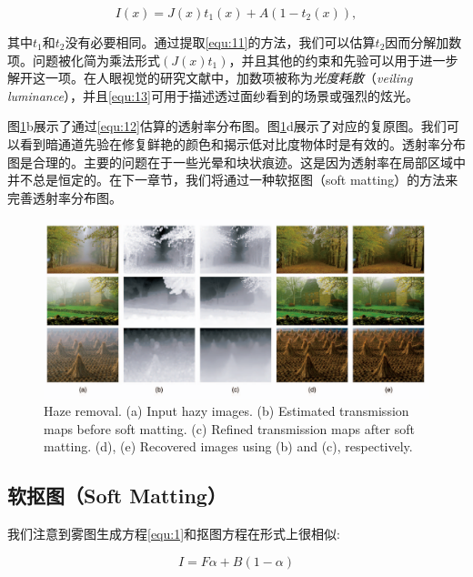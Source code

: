 \documentclass{ctexart}
\begin{document}
\begin{equation}\label{equ:13}
	I(x) = J(x)t_1(x) + A(1 - t_2(x)),
\end{equation}

其中$t_1$和$t_2$没有必要相同。通过提取\ref{equ:11}的方法，我们可以估算$t_2$因而分解加数项。问题被化简为乘法形式$(J(x)t_1)$，并且其他的约束和先验可以用于进一步解开这一项。在人眼视觉的研究文献\cite{GilchristJacobsen1983}中，加数项被称为\emph{光度耗散}（\emph{veiling luminance}），并且\ref{equ:13}可用于描述透过面纱看到的场景或强烈的炫光。\par

图\ref{fig:06}b展示了通过\ref{equ:12}估算的透射率分布图。图\ref{fig:06}d展示了对应的复原图。我们可以看到暗通道先验在修复鲜艳的颜色和揭示低对比度物体时是有效的。透射率分布图是合理的。主要的问题在于一些光晕和块状痕迹。这是因为透射率在局部区域中并不总是恒定的。在下一章节，我们将通过一种软抠图（soft matting）的方法来完善透射率分布图。\par

\begin{figure}[tbp]
	\centering
	\includegraphics[width=\textwidth]{img/06.png}
	\caption{Haze removal. (a) Input hazy images. (b) Estimated transmission maps before soft matting. (c) Refined transmission maps after soft matting. (d), (e) Recovered images using (b) and (c), respectively.}\label{fig:06}
\end{figure}



\subsection{软抠图（Soft Matting）} %
我们注意到雾图生成方程\ref{equ:1}和抠图方程在形式上很相似:

\begin{equation}\label{equ:14}
	I = F \alpha + B (1 - \alpha)
\end{equation}
\end{document}
